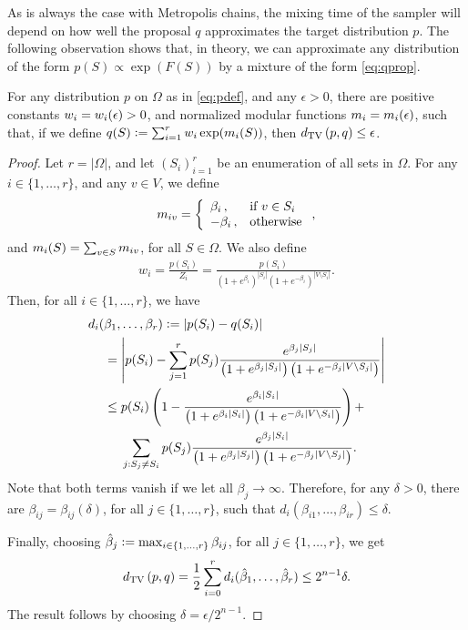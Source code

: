 As is always the case with Metropolis chains, the mixing time of the \Ms{} sampler will depend on how well the proposal $q$ approximates the target distribution $p$.
The following observation shows that, in theory, we can approximate any distribution of the form $p(S) \propto \exp(F(S))$ by a mixture of the form \eqref{eq:qprop}.

\begin{prop} \label{prop:decomp}
  For any distribution $p$ on $\Omega$ as in \eqref{eq:pdef}, and any $\epsilon > 0$, there are positive constants $w_i = w_i(\epsilon) > 0$, and normalized modular functions $m_i = m_i(\epsilon)$, such that, if we define $q(S) \vcentcolon= \sum_{i = 1}^r w_i \exp(m_i(S))$, then $d_{\textrm{TV}}\left( p, q \right) \leq \epsilon$.
\end{prop}

\begin{proof}
  Let $r = |\Omega|$, and let $\left( S_i \right)_{i = 1}^r$ be an enumeration of all sets in $\Omega$.
  For any $i \in \{1, \ldots, r\}$, and any $v \in V$, we define
  \begin{align*}
    m_{iv} = \left\{ \begin{array}{ll} \beta_i\,,& \mbox{if } v \in S_i \\ -\beta_i\,,& \mbox{otherwise} \end{array} \right.,
  \end{align*}
  and $m_i(S) = \sum_{v \in S} m_{iv}$, for all $S \in \Omega$.
  We also define
  \begin{align*}
    w_i = \frac{p(S_i)}{Z_i} = \frac{p(S_i)}{\left(1 + e^{\beta_i}\right)^{|S_i|}\left(1 + e^{-\beta_i}\right)^{|V \setminus S_i|}}.
  \end{align*}
  Then, for all $i \in \{1, \ldots, r\}$, we have
  \begin{align*}
    d_i(&\beta_1, \ldots, \beta_r) \vcentcolon= |p(S_i) - q(S_i)| \\
      &= \left| p(S_i) - \sum_{j = 1}^r p(S_j) \frac{e^{\beta_j|S_j|}}{\left( 1 + e^{\beta_j|S_j|} \right) \left( 1 + e^{-\beta_j|V \setminus S_j|} \right)} \right| \\
      &\leq p(S_i) \left( 1 - \frac{e^{\beta_i|S_i|}}{\left( 1 + e^{\beta_i|S_i|} \right) \left( 1 + e^{-\beta_i|V \setminus S_i|} \right)} \right) +\\
      &\ \ \ \ \sum_{j : S_j \neq S_i} p(S_j) \frac{e^{\beta_j|S_i|}}{\left( 1 + e^{\beta_j|S_j|} \right) \left( 1 + e^{-\beta_j|V \setminus S_j|} \right)}.
  \end{align*}
  Note that both terms vanish if we let all $\beta_j \to \infty$.
  Therefore, for any $\delta > 0$, there are $\beta_{ij} = \beta_{ij}(\delta)$, for all $j \in \{1, \ldots, r\}$, such that $d_i(\beta_{i1}, \ldots, \beta_{ir}) \leq \delta$.
  
  Finally, choosing $\hat{\beta}_j \vcentcolon= \max_{i \in \{1, \ldots, r\}} \beta_{ij}$, for all $j \in \{1, \ldots, r\}$, we get
  \begin{align*}
    d_{\textrm{TV}}\left( p, q \right) = \frac{1}{2}\sum_{i = 0}^r d_i(\hat{\beta}_1, \ldots, \hat{\beta}_r) \leq 2^{n-1} \delta.
  \end{align*}
  The result follows by choosing $\delta = \epsilon / 2^{n-1}$.
\end{proof}

